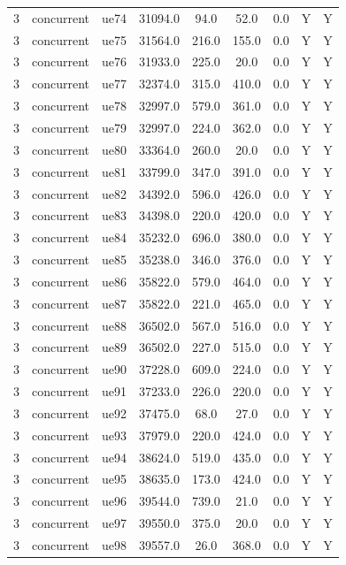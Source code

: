 \begin{table}[ht]
\begin{tabular}{|c|c|c|c|c|c|c|c|c|}
3 & concurrent & ue74 & 31094.0 & 94.0 & 52.0 & 0.0 & Y & Y \\
3 & concurrent & ue75 & 31564.0 & 216.0 & 155.0 & 0.0 & Y & Y \\
3 & concurrent & ue76 & 31933.0 & 225.0 & 20.0 & 0.0 & Y & Y \\
3 & concurrent & ue77 & 32374.0 & 315.0 & 410.0 & 0.0 & Y & Y \\
3 & concurrent & ue78 & 32997.0 & 579.0 & 361.0 & 0.0 & Y & Y \\
3 & concurrent & ue79 & 32997.0 & 224.0 & 362.0 & 0.0 & Y & Y \\
3 & concurrent & ue80 & 33364.0 & 260.0 & 20.0 & 0.0 & Y & Y \\
3 & concurrent & ue81 & 33799.0 & 347.0 & 391.0 & 0.0 & Y & Y \\
3 & concurrent & ue82 & 34392.0 & 596.0 & 426.0 & 0.0 & Y & Y \\
3 & concurrent & ue83 & 34398.0 & 220.0 & 420.0 & 0.0 & Y & Y \\
3 & concurrent & ue84 & 35232.0 & 696.0 & 380.0 & 0.0 & Y & Y \\
3 & concurrent & ue85 & 35238.0 & 346.0 & 376.0 & 0.0 & Y & Y \\
3 & concurrent & ue86 & 35822.0 & 579.0 & 464.0 & 0.0 & Y & Y \\
3 & concurrent & ue87 & 35822.0 & 221.0 & 465.0 & 0.0 & Y & Y \\
3 & concurrent & ue88 & 36502.0 & 567.0 & 516.0 & 0.0 & Y & Y \\
3 & concurrent & ue89 & 36502.0 & 227.0 & 515.0 & 0.0 & Y & Y \\
3 & concurrent & ue90 & 37228.0 & 609.0 & 224.0 & 0.0 & Y & Y \\
3 & concurrent & ue91 & 37233.0 & 226.0 & 220.0 & 0.0 & Y & Y \\
3 & concurrent & ue92 & 37475.0 & 68.0 & 27.0 & 0.0 & Y & Y \\
3 & concurrent & ue93 & 37979.0 & 220.0 & 424.0 & 0.0 & Y & Y \\
3 & concurrent & ue94 & 38624.0 & 519.0 & 435.0 & 0.0 & Y & Y \\
3 & concurrent & ue95 & 38635.0 & 173.0 & 424.0 & 0.0 & Y & Y \\
3 & concurrent & ue96 & 39544.0 & 739.0 & 21.0 & 0.0 & Y & Y \\
3 & concurrent & ue97 & 39550.0 & 375.0 & 20.0 & 0.0 & Y & Y \\
3 & concurrent & ue98 & 39557.0 & 26.0 & 368.0 & 0.0 & Y & Y \\

\end{tabular}
\end{table}
